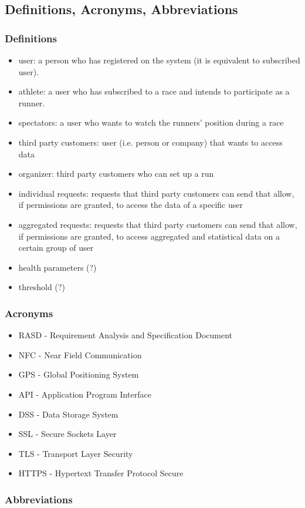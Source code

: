\subsection{Definitions, Acronyms, Abbreviations}
\subsubsection{Definitions}
\begin{itemize}
\item user: a person who has registered on the system (it is equivalent to subscribed user).
\item athlete: a user who has subscribed to a race and intends to participate as a runner.
\item spectators: a user who wants to watch the runners' position during a race   
\item third party customers: user (i.e. person or company) that wants to access data
\item organizer: third party customers who can set up a run
\item individual requests: requests that third party customers can send that allow, if permissions are granted, to access the data of a specific user
\item aggregated requests: requests that third party customers can send that allow, if permissions are granted, to access aggregated and statistical data on a certain group of user
\item health parameters (?)
\item threshold (?)
\end{itemize}

\subsubsection{Acronyms}
\begin{itemize}
\item RASD - Requirement Analysis and Specification Document
\item NFC - Near Field Communication
\item GPS - Global Positioning System
\item API - Application Program Interface
\item DSS - Data Storage System
\item SSL - Secure Sockets Layer
\item TLS - Transport Layer Security
\item HTTPS - Hypertext Transfer Protocol Secure
\end{itemize}

\subsubsection{Abbreviations}
